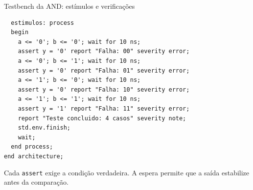 \begin{frame}[fragile,t]{Testbench da AND: estímulos e verificações}
\begin{lstlisting}
  estimulos: process
  begin
    a <= '0'; b <= '0'; wait for 10 ns;
    assert y = '0' report "Falha: 00" severity error;
    a <= '0'; b <= '1'; wait for 10 ns;
    assert y = '0' report "Falha: 01" severity error;
    a <= '1'; b <= '0'; wait for 10 ns;
    assert y = '0' report "Falha: 10" severity error;
    a <= '1'; b <= '1'; wait for 10 ns;
    assert y = '1' report "Falha: 11" severity error;
    report "Teste concluido: 4 casos" severity note;
    std.env.finish;
    wait;
  end process;
end architecture;
\end{lstlisting}\small Cada \texttt{assert} exige a condição verdadeira. A espera permite que a saída estabilize antes da comparação.
\end{frame}
